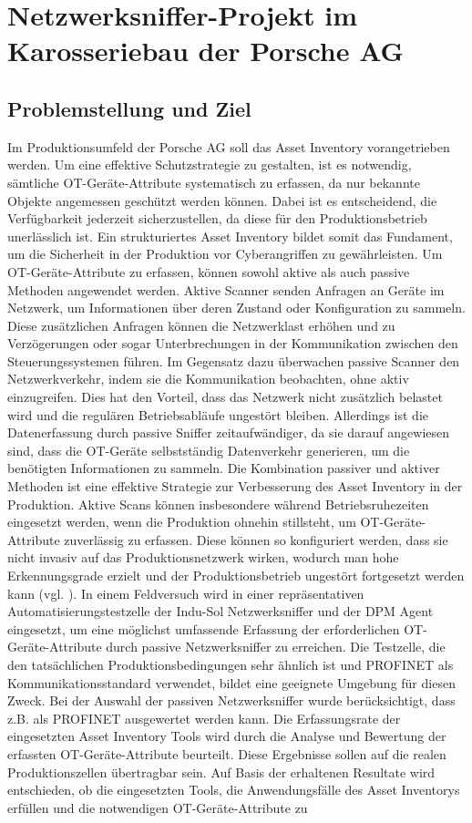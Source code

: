 \section{Netzwerksniffer-Projekt im Karosseriebau der Porsche AG}

\subsection{Problemstellung und Ziel}
Im Produktionsumfeld der Porsche AG soll das Asset Inventory vorangetrieben werden. Um eine effektive Schutzstrategie zu gestalten, ist es notwendig, sämtliche OT-Geräte-Attribute systematisch zu erfassen, da nur bekannte Objekte angemessen geschützt werden können. Dabei ist es entscheidend, die Verfügbarkeit jederzeit sicherzustellen, da diese für den Produktionsbetrieb unerlässlich ist. Ein strukturiertes Asset Inventory bildet somit das Fundament, um die Sicherheit in der Produktion vor Cyberangriffen zu gewährleisten. Um OT-Geräte-Attribute zu erfassen, können sowohl aktive als auch passive Methoden angewendet werden. Aktive Scanner senden Anfragen an Geräte im Netzwerk, um Informationen über deren Zustand oder Konfiguration zu sammeln. Diese zusätzlichen Anfragen können die Netzwerklast erhöhen und zu Verzögerungen oder sogar Unterbrechungen in der Kommunikation zwischen den Steuerungssystemen führen. Im Gegensatz dazu überwachen passive Scanner den Netzwerkverkehr, indem sie die Kommunikation beobachten, ohne aktiv einzugreifen. Dies hat den Vorteil, dass das Netzwerk nicht zusätzlich belastet wird und die regulären Betriebsabläufe ungestört bleiben. Allerdings ist die Datenerfassung durch passive Sniffer zeitaufwändiger, da sie darauf angewiesen sind, dass die OT-Geräte selbstständig Datenverkehr generieren, um die benötigten Informationen zu sammeln. Die Kombination passiver und aktiver Methoden ist eine effektive Strategie zur Verbesserung des Asset Inventory in der Produktion. Aktive Scans können insbesondere während Betriebsruhezeiten eingesetzt werden, wenn die Produktion ohnehin stillsteht, um OT-Geräte-Attribute zuverlässig zu erfassen. Diese können so konfiguriert werden, dass sie nicht invasiv auf das Produktionsnetzwerk wirken, wodurch man hohe Erkennungsgrade erzielt und der Produktionsbetrieb ungestört fortgesetzt werden kann (vgl. \cite{aktivScan}). In einem Feldversuch wird in einer repräsentativen Automatisierungstestzelle der Indu-Sol Netzwerksniffer und der DPM Agent eingesetzt, um eine möglichst umfassende Erfassung der erforderlichen OT-Geräte-Attribute durch passive Netzwerksniffer zu erreichen. Die Testzelle, die den tatsächlichen Produktionsbedingungen sehr ähnlich ist und PROFINET als Kommunikationsstandard verwendet, bildet eine geeignete Umgebung für diesen Zweck. Bei der Auswahl der passiven Netzwerksniffer wurde berücksichtigt, dass z.B. als PROFINET ausgewertet  werden kann. Die Erfassungsrate der eingesetzten Asset Inventory Tools wird durch die Analyse und Bewertung der erfassten OT-Geräte-Attribute beurteilt. Diese Ergebnisse sollen auf die realen Produktionszellen übertragbar sein. Auf Basis der erhaltenen Resultate wird entschieden, ob die eingesetzten Tools, die Anwendungsfälle des Asset Inventorys erfüllen und die notwendigen OT-Geräte-Attribute zu 